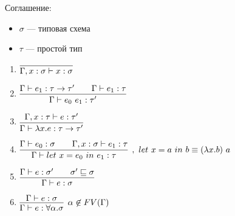 \documentclass[12pt]{article}
\begin{document}
Соглашение:
\begin{itemize}
    \item $\sigma$ --- типовая схема
    \item $\tau$ --- простой тип
\end{itemize}


\begin{enumerate}
    \item $\vcenter{\infer{\Gamma, x : \sigma \vdash x : \sigma}{}}$
    \item $\vcenter{\infer{\Gamma \vdash e_0\ e_1 : \tau'}{\Gamma \vdash e_1 : \tau \rightarrow \tau' \qquad \Gamma \vdash e_1 : \tau}}$
    \item $\vcenter{\infer{\Gamma \vdash \lambda x.e : \tau \rightarrow \tau'}{\Gamma, x : \tau \vdash e : \tau'}}$
    \item $\vcenter{\infer[,\ let\ x = a\ in\ b \equiv (\lambda x.b)\ a]{\Gamma \vdash let\ x = e_0\ in\ e_1 : \tau}{\Gamma \vdash e_0 : \sigma \qquad \Gamma, x : \sigma \vdash e_1 : \tau}}$ 
    \item $\vcenter{\infer{\Gamma \vdash e : \sigma}{\Gamma \vdash e : \sigma' \qquad  \sigma' \sqsubseteq \sigma}}$
    \item $\vcenter{\infer[\alpha \not \in FV(\Gamma)]{\Gamma \vdash e : \forall \alpha.\sigma}{\Gamma \vdash e : \sigma}}$
\end{enumerate}
\end{document}
